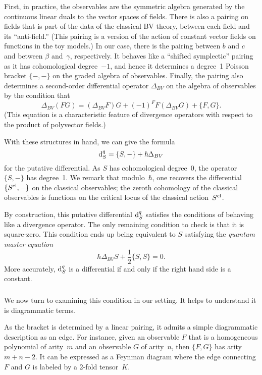 First, in practice, the observables are the symmetric algebra generated by the continuous linear duals to the vector spaces of fields.
There is also a pairing on fields that is part of the data of the classical BV theory,
between each field and its ``anti-field.''
(This pairing is a version of the action of constant vector fields on functions in the toy models.)
In our case, there is the pairing between $b$ and $c$ and between $\beta$ and~$\gamma$, respectively.
It behaves like a ``shifted symplectic'' pairing as it has cohomological degree~$-1$,
and hence it determines a degree~1 Poisson bracket $\{-,-\}$ on the graded algebra of observables.
Finally, the pairing also determines a second-order differential operator $\Delta_{BV}$ on the algebra of observables by the condition that
\[
\Delta_{BV}(FG) = (\Delta_{BV}F)G + (-1)^F F(\Delta_{BV}G) + \{F,G\}.
\]
(This equation is a characteristic feature of divergence operators with respect to the product of polyvector fields.)

With these structures in hand, we can give the formula
\[
{\rm d}^q_S=\{S,-\} + \hbar\Delta_{BV}
\]
for the putative differential.
As $S$ has cohomological degree~0, the operator $\{S,-\}$ has degree~1.
We remark that modulo~$\hbar$, one recovers the differential $\{S^{\rm cl},-\}$ on the classical observables;
the zeroth cohomology of the classical observables is functions on the critical locus of the classical action~$S^{\rm cl}$.

By construction, this putative differential ${\rm d}_S^q$ satisfies the conditions of behaving like a divergence operator.
The only remaining condition to check is that it is square-zero.
This condition ends up being equivalent to $S$ satisfying the {\em quantum master equation}
\begin{equation}
\hbar \Delta_{BV} S + \frac{1}{2}\{S,S\} = 0.
\end{equation}
More accurately, ${\rm d}^q_S$ is a differential if and only if the right hand side is a constant.


\subsubsection{}

We now turn to examining this condition in our setting.
It helps to understand it is diagrammatic terms.

As the bracket is determined by a linear pairing,
it admits a simple diagrammatic description as an edge.
For instance, given an observable $F$ that is a homogeneous polynomial of arity~$m$
and an observable $G$ of arity~$n$, 
then $\{F,G\}$ has arity~$m+n-2$.
It can be expressed as a Feynman diagram 
where the edge connecting $F$ and $G$ is labeled by a 2-fold tensor~$K$.

